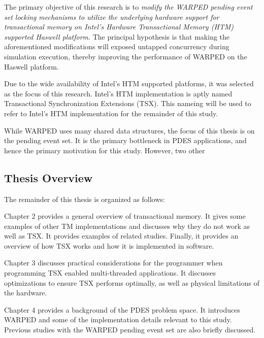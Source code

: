 \documentclass[a4paper]{article}
\begin{document}
\indent
The primary objective of this research is to \textit{modify the WARPED pending event set
    locking mechanisms to utilize the underlying hardware support for
    transactional memory on Intel's Hardware Transactional Memory (HTM)
supported Haswell platform}.  The principal hypothesis is that making the
aforementioned modifications will exposed untapped concurrency 
during simulation execution, thereby improving the performance of WARPED on the
Haswell platform.
\par

\indent
Due to the wide availability of Intel's HTM supported platforms, it was
selected as the focus of this research.  Intel's HTM implementation is aptly
named Transactional Synchronization Extensions (TSX).  This nameing will be used
to refer to Intel's HTM implementation for the remainder of this study.
\par

\indent 
While WARPED uses many shared data structures, the focus of this thesis
is on the pending event set.  It is the primary bottleneck in PDES applications,
and hence the primary motivation for this study.  However, two other 
\par

\subsection{\textbf{Thesis Overview}}

The remainder of this thesis is organized as follows:
\par

\indent 
Chapter 2 provides a general overview of transactional memory.  It gives
some examples of other TM implementations and discusses why they do not work as
well as TSX.  It provides examples of related studies.  Finally, it provides an
overview of how TSX works and how it is implemented in software.
\par

\indent
Chapter 3 discusses practical considerations for the programmer when programming
TSX enabled multi-threaded applications.  It discusses optimizations to ensure
TSX performs optimally, as well as physical limitations of the hardware.
\par

\indent
Chapter 4 provides a background of the PDES problem space.  It introduces
WARPED and some of the implementation details relevant to this study. Previous
studies with the WARPED pending event set are also briefly discussed.
\par
\end{document}
